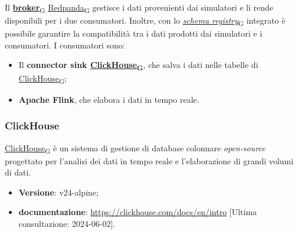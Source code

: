 Il \href{https://7last.github.io/docs/pb/documentazione-interna/glossario\#broker}{\textbf{broker}\textsubscript{G}} \href{https://7last.github.io/docs/pb/documentazione-interna/glossario\#redpanda}{Redpanda\textsubscript{G}} gestisce i dati provenienti dai simulatori e li rende disponibili per i due consumatori. Inoltre,
con lo \href{https://7last.github.io/docs/pb/documentazione-interna/glossario\#schema-registry}{\textit{schema registry}\textsubscript{G}} integrato è possibile garantire la compatibilità tra i dati prodotti dai simulatori e i consumatori.
I consumatori sono:
\begin{itemize}
	\item Il \textbf{connector sink \href{https://7last.github.io/docs/pb/documentazione-interna/glossario\#clickhouse}{ClickHouse\textsubscript{G}}}, che salva i dati nelle tabelle di \href{https://7last.github.io/docs/pb/documentazione-interna/glossario\#clickhouse}{ClickHouse\textsubscript{G}};
	\item \textbf{Apache Flink}, che elabora i dati in tempo reale.
\end{itemize}

\subsubsection{ClickHouse}
\href{https://7last.github.io/docs/pb/documentazione-interna/glossario\#clickhouse}{ClickHouse\textsubscript{G}} è un sistema di gestione di database colonnare \textit{open-source} progettato per l'analisi dei dati in tempo reale e l'elaborazione di grandi volumi di dati.
\begin{itemize}
	\item \textbf{Versione}: v24-alpine;
	\item \textbf{documentazione}: \url{https://clickhouse.com/docs/en/intro} [Ultima consultazione: 2024-06-02].
\end{itemize}

